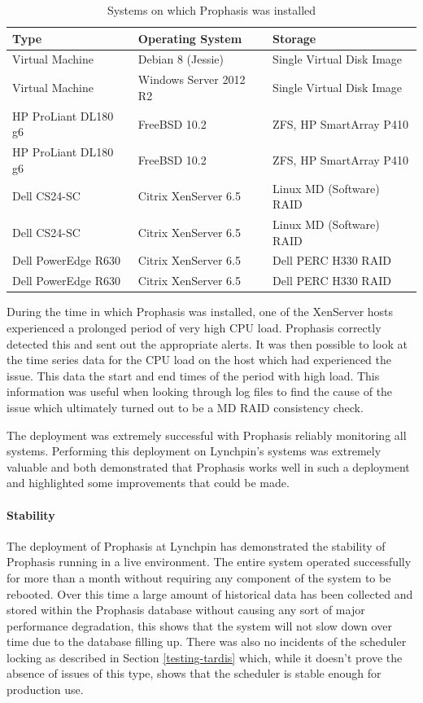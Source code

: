 \documentclass[bsc,deptreport,twoside,parskip,singlespacing,notimes]{infthesis}
\begin{document}
\begin{table}[H]
	\centering
	\caption{Systems on which Prophasis was installed}
	\label{table-lypn-hosts}
    \begin{tabular}{|l|l|l|}
    \hline
    \textbf{Type} & \textbf{Operating System} & \textbf{Storage} \\ \hline
    Virtual Machine & Debian 8 (Jessie) & Single Virtual Disk Image \\
    Virtual Machine & Windows Server 2012 R2 & Single Virtual Disk Image \\
    HP ProLiant DL180 g6 & FreeBSD 10.2 & ZFS, HP SmartArray P410 \\
    HP ProLiant DL180 g6 & FreeBSD 10.2 & ZFS, HP SmartArray P410 \\
    Dell CS24-SC & Citrix XenServer 6.5 & Linux MD (Software) RAID \\
    Dell CS24-SC & Citrix XenServer 6.5 & Linux MD (Software) RAID \\
    Dell PowerEdge R630 & Citrix XenServer 6.5 & Dell PERC H330 RAID \\
    Dell PowerEdge R630 & Citrix XenServer 6.5 & Dell PERC H330 RAID \\ \hline
    \end{tabular}
\end{table}


	During the time in which Prophasis was installed, one of the XenServer hosts
	experienced a prolonged period of very high CPU load.  Prophasis
	correctly detected this and sent out the appropriate alerts.  It was then 
	possible to look at the time series data for the CPU load on the host which
	had experienced the issue. This data the start and end times of the period
	with high load. This information was useful when looking through log files
	to find the cause of the issue which ultimately turned out to be a MD RAID
	consistency check.


	The deployment was extremely successful with Prophasis reliably monitoring all
	systems.  Performing this deployment on Lynchpin's systems was extremely
	valuable and both demonstrated that Prophasis works well in such a deployment
	and highlighted some improvements that could be made.

\paragraph*{Stability}
	The deployment of Prophasis at Lynchpin has demonstrated the stability of
	Prophasis running in a live environment.  The entire system operated
	successfully for more than a month without requiring any component of the
	system to be rebooted.  Over this time a large amount of historical data has
	been collected and stored within the Prophasis database without causing any
	sort of major performance degradation, this shows that the system will not slow
	down over time due to the database filling up.  There was also no incidents of
	the scheduler locking as described in Section \ref{testing-tardis} which,
	while it doesn't prove the absence of issues of this type, shows that the
	scheduler is stable enough for production use.
\end{document}
